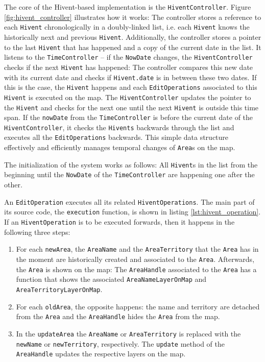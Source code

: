 The core of the Hivent-based implementation is the \texttt{HiventController}. Figure \ref{fig:hivent_controller} illustrates how it works: The controller stores a reference to each \texttt{Hivent} chronologically in a doubly-linked list, i.e. each \texttt{Hivent} knows the historically next and previous \texttt{Hivent}. Additionally, the controller stores a pointer to the last \texttt{Hivent} that has happened and a copy of the current date in the list. It listens to the \texttt{TimeController} -- if the \texttt{NowDate} changes, the \texttt{HiventController} checks if the next \texttt{Hivent} has happened: The controller compares this new date with its current date and checks if \texttt{Hivent.date} is in between these two dates. If this is the case, the \texttt{Hivent} happens and each \texttt{EditOperations} associated to this \texttt{Hivent} is executed on the map. The \texttt{HiventController} updates the pointer to the \texttt{Hivent} and checks for the next one until the next \texttt{Hivent} is outside this time span. If the \texttt{nowDate} from the \texttt{TimeController} is before the current date of the \texttt{HiventController}, it checks the \texttt{Hivents} backwards through the list and executes all the \texttt{EditOperations} backwards. This simple data structure effectively and efficiently manages temporal changes of \texttt{Area}s on the map.

The initialization of the system works as follows: All \texttt{Hivent}s in the list from the beginning until the \texttt{NowDate} of the \texttt{TimeController} are happening one after the other.

An \texttt{EditOperation} executes all its related \texttt{HiventOperations}. The main part of its source code, the \texttt{execution} function, is shown in listing \ref{lst:hivent_operation}. If an \texttt{HiventOperation} is to be executed forwards, then it happens in the following three steps:

\begin{enumerate}
  \item For each \texttt{newArea}, the \texttt{AreaName} and the \texttt{AreaTerritory} that the \texttt{Area} has in the moment are historically created and associated to the \texttt{Area}. Afterwards, the \texttt{Area} is shown on the map: The \texttt{AreaHandle} associated to the \texttt{Area} has a function that shows the associated \texttt{AreaNameLayerOnMap} and \texttt{AreaTerritoryLayerOnMap}.
  \item For each \texttt{oldArea}, the opposite happens: the name and territory are detached from the \texttt{Area} and the \texttt{AreaHandle} hides the \texttt{Area} from the map.
  \item In the \texttt{updateArea} the \texttt{AreaName} or \texttt{AreaTerritory} is replaced with the \texttt{newName} or \texttt{newTerritory}, respectively. The \texttt{update} method of the \texttt{AreaHandle} updates the respective layers on the map.
\end{enumerate}

